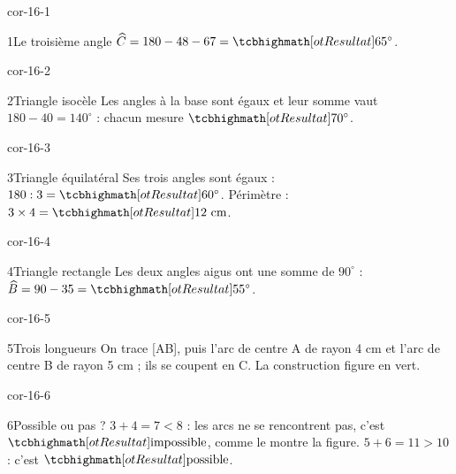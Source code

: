 \clearpage\pagestyle{otMain}\setlength{\otBlocEspacement}{2.5mm}\fontsize{11}{15}\selectfont{}
\begin{blocLivre}{cor-16-1}\begin{corrige}{1}{Le troisième angle}
$\widehat{C}=180-48-67=\res{65^\circ}$.
\label{fig-cor-16-1}
\end{corrige}\end{blocLivre}
\begin{blocLivre}{cor-16-2}\begin{corrige}{2}{Triangle isocèle}
Les angles à la base sont égaux et leur somme vaut $180-40=140^\circ$ : chacun mesure $\res{70^\circ}$.
\label{fig-cor-16-2}
\end{corrige}\end{blocLivre}
\begin{blocLivre}{cor-16-3}\begin{corrige}{3}{Triangle équilatéral}
Ses trois angles sont égaux : $180:3=\res{60^\circ}$. Périmètre : $3\times4=\res{12\ \mathrm{cm}}$.
\label{fig-cor-16-3}
\end{corrige}\end{blocLivre}
\begin{blocLivre}{cor-16-4}\begin{corrige}{4}{Triangle rectangle}
Les deux angles aigus ont une somme de $90^\circ$ : $\widehat{B}=90-35=\res{55^\circ}$.
\label{fig-cor-16-4}
\end{corrige}\end{blocLivre}
\begin{blocLivre}{cor-16-5}\begin{corrige}{5}{Trois longueurs}
On trace [AB], puis l’arc de centre A de rayon 4 cm et l’arc de centre B de rayon 5 cm ; ils se coupent en C. La construction figure en vert.
\label{fig-cor-16-5}
\end{corrige}\end{blocLivre}
\begin{blocLivre}{cor-16-6}\begin{corrige}{6}{Possible ou pas ?}
$3+4=7<8$ : les arcs ne se rencontrent pas, c’est $\res{\text{impossible}}$, comme le montre la figure. $5+6=11>10$ : c’est $\res{\text{possible}}$.
\label{fig-cor-16-6}
\end{corrige}\end{blocLivre}
